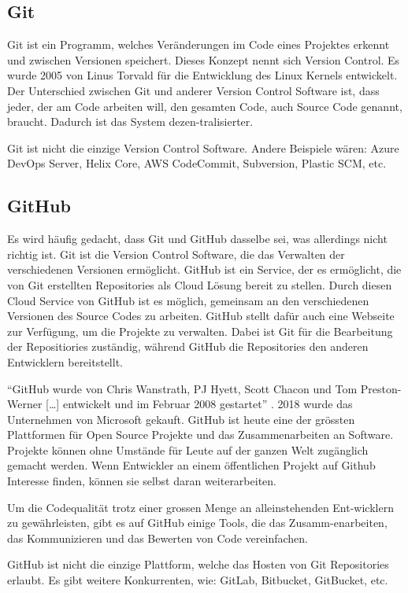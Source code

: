 \subsection*{Git}
Git ist ein Programm, welches Veränderungen im Code eines Projektes erkennt und
zwischen Versionen speichert. Dieses Konzept nennt sich Version Control. Es
wurde 2005 von Linus Torvald für die Entwicklung des Linux Kernels entwickelt.
Der Unterschied zwischen Git und anderer Version Control Software ist, dass
jeder, der am Code arbeiten will, den gesamten Code, auch Source Code genannt,
braucht. Dadurch ist das System dezen\hyp{}tralisierter.
\cite{noauthor_git_2021}

Git ist nicht die einzige Version Control Software. Andere Beispiele wären:
Azure DevOps Server, Helix Core, AWS CodeCommit, Subversion, Plastic SCM, etc. 
\cite{noauthor_git_nodate-1}

\subsection*{GitHub}
Es wird häufig gedacht, dass Git und GitHub dasselbe sei, was allerdings nicht
richtig ist. Git ist die Version Control Software, die das Verwalten der
verschiedenen Versionen ermöglicht. GitHub ist ein Service, der es ermöglicht,
die von Git erstellten Repositories als Cloud Lösung bereit zu stellen. Durch
diesen Cloud Service von GitHub ist es möglich, gemeinsam an den verschiedenen
Versionen des Source Codes zu arbeiten. GitHub stellt dafür auch eine Webseite
zur Verfügung, um die Projekte zu verwalten. Dabei ist Git für die Bearbeitung
der Repositiories zuständig, während GitHub die Repositories den anderen
Entwicklern bereitstellt.
\cite{noauthor_github_2021} 

``GitHub wurde von Chris Wanstrath, PJ Hyett, Scott Chacon und Tom Preston-Werner
[\ldots] entwickelt und im Februar 2008 gestartet'' \cite{noauthor_github_2021}.
2018 wurde das Unternehmen von Microsoft gekauft. GitHub ist heute eine der
grössten Plattformen für Open Source Projekte und das Zusammenarbeiten an
Software. Projekte können ohne Umstände für Leute auf der ganzen Welt zugänglich
gemacht werden. Wenn Entwickler an einem öffentlichen Projekt auf Github
Interesse finden, können sie selbst daran weiterarbeiten. 
\cite{noauthor_github_2021}

Um die Codequalität trotz einer grossen Menge an alleinstehenden Ent\hyp{}wicklern zu
gewährleisten, gibt es auf GitHub einige Tools, die das Zusamm\hyp{}enarbeiten, das
Kommunizieren und das Bewerten von Code vereinfachen.

GitHub ist nicht die einzige Plattform, welche das Hosten von Git Repositories
erlaubt. Es gibt weitere Konkurrenten, wie: GitLab, Bitbucket, GitBucket, etc.
\cite{noauthor_top_2021}
